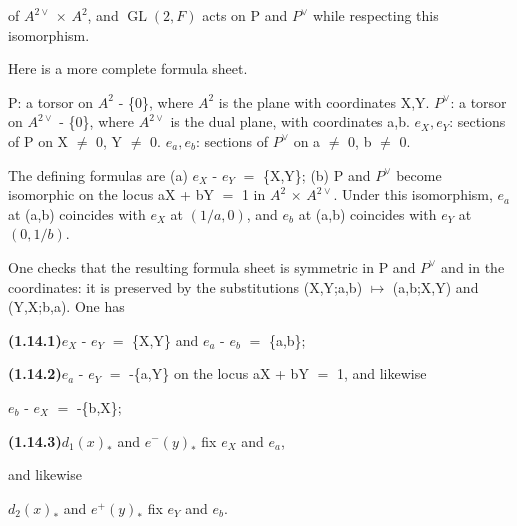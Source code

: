 \documentclass[10pt,a4paper]{article}
\begin{document}
\clearpage
{}
\label{d035-physical-013}
\par of $A^{2\vee{}}$ $\times{}$ $A^2$, and $\operatorname{GL}(2,F)$ acts on P and $P^\vee{}$ while respecting this isomorphism.\par
\par Here is a more complete formula sheet.\par
\par\medskip{}\par\smallskip
\par P: a torsor on $A^2$ - \{0\}, where $A^2$ is the plane with coordinates X,Y. $P^\vee{}$: a torsor on $A^{2\vee{}}$ - \{0\}, where $A^{2\vee{}}$ is the dual plane, with coordinates a,b. $e_X,e_Y$: sections of P on X $\ne{}$ 0, Y $\ne{}$ 0. $e_a,e_b$: sections of $P^\vee{}$ on a $\ne{}$ 0, b $\ne{}$ 0.\par
\par The defining formulas are (a) $e_X$ - $e_Y$ $=$ \{X,Y\}; (b) P and $P^\vee{}$ become isomorphic on the locus aX + bY $=$ 1 in $A^2$ $\times{}$ $A^{2\vee{}}$. Under this isomorphism, $e_a$ at (a,b) coincides with $e_X$ at $(1/a,0)$, and $e_b$ at (a,b) coincides with $e_Y$ at $(0,1/b)$.\par
\par One checks that the resulting formula sheet is symmetric in P and $P^\vee{}$ and in the coordinates: it is preserved by the substitutions (X,Y;a,b) $\mapsto{}$ (a,b;X,Y) and (Y,X;b,a). One has\par
\par\noindent\textbf{(1.14.1)}\quad $e_X$ - $e_Y$ $=$ \{X,Y\} and $e_a$ - $e_b$ $=$ \{a,b\};\par
\par\noindent\textbf{(1.14.2)}\quad $e_a$ - $e_Y$ $=$ -\{a,Y\} on the locus aX + bY $=$ 1, and likewise\par
\par\smallskip\begin{center}\begin{minipage}{0.96\textwidth}\centering
$e_b$ - $e_X$ $=$ -\{b,X\};
\end{minipage}\end{center}\smallskip
\par\noindent\textbf{(1.14.3)}\quad $d_1(x)_*$ and $e^-(y)_*$ fix $e_X$ and $e_a$,\par
\par and likewise\par
\par\smallskip\begin{center}\begin{minipage}{0.96\textwidth}\centering
$d_2(x)_*$ and $e^+(y)_*$ fix $e_Y$ and $e_b$.
\end{minipage}\end{center}\smallskip
\end{document}
